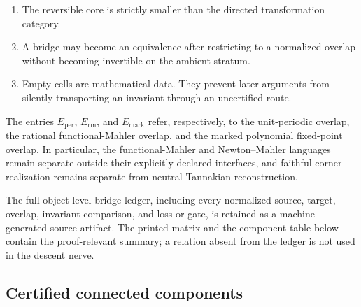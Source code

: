 \begin{enumerate}
\item The reversible core is strictly smaller than the directed transformation category.
\item A bridge may become an equivalence after restricting to a normalized overlap without becoming invertible on the ambient stratum.
\item Empty cells are mathematical data.  They prevent later arguments from silently transporting an invariant through an uncertified route.
\end{enumerate}

The entries \(E_{\mathrm{per}}\), \(E_{\mathrm{rm}}\), and \(E_{\mathrm{mark}}\) refer, respectively, to the unit-periodic overlap, the rational functional-Mahler overlap, and the marked polynomial fixed-point overlap.  In particular, the functional-Mahler and Newton--Mahler languages remain separate outside their explicitly declared interfaces, and faithful corner realization remains separate from neutral Tannakian reconstruction.

The full object-level bridge ledger, including every normalized source, target, overlap, invariant comparison, and loss or gate, is retained as a machine-generated source artifact.  The printed matrix and the component table below contain the proof-relevant summary; a relation absent from the ledger is not used in the descent nerve.

\subsection{Certified connected components}
\label{subsec:block13-components}

